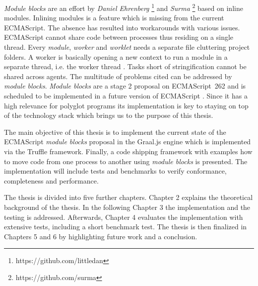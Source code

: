 \emph{Module blocks} are an effort by \emph{Daniel Ehrenberg} \footnote{https://github.com/littledan} and \emph{Surma} \footnote{https://github.com/surma} based on inline modules. Inlining modules is a feature which is missing from the current ECMAScript. The absence has resulted into workarounds with various issues. ECMAScript cannot share code between processes thus residing on a single thread. Every \emph{module}, \emph{worker} and \emph{worklet} needs a separate file cluttering project folders. A worker is basically opening a new context to run a module in a separate thread, i.e. the worker thread \cite{workers}. Tasks short of stringification cannot be shared across agents. The multitude of problems cited can be addressed by \emph{module blocks}. \emph{Module blocks} are a stage 2 proposal on ECMAScript~262 and is scheduled to be implemented in a future version of ECMAScript \cite{gitMB}. Since it has a high relevance for polyglot programs its implementation is key to staying on top of the technology stack which brings us to the purpose of this thesis.

The main objective of this thesis is to implement the current state of the ECMAScript \emph{module blocks} proposal in the Graal.js engine which is implemented via the Truffle framework. Finally, a code shipping framework with examples how to move code from one process to another using \emph{module blocks} is presented. The implementation will include tests and benchmarks to verify conformance, completeness and performance.

The thesis is divided into five further chapters. Chapter 2 explains the theoretical background of the thesis. In the following Chapter 3 the implementation and the testing is addressed. Afterwards, Chapter 4 evaluates the implementation with extensive tests, including a short benchmark test. The thesis is then finalized in Chapters 5 and 6 by highlighting future work and a conclusion.



